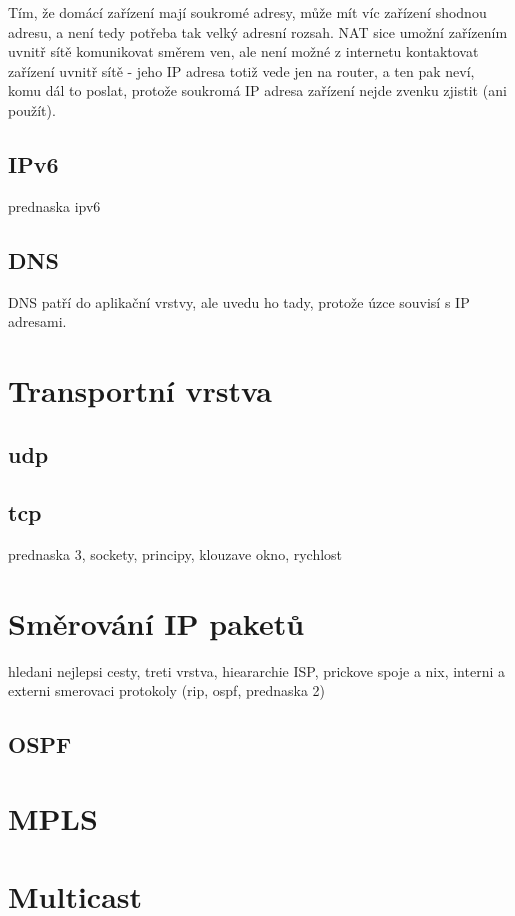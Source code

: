 Tím, že domácí zařízení mají soukromé adresy, může mít víc zařízení shodnou adresu, a není tedy potřeba tak velký adresní rozsah. NAT sice umožní zařízením uvnitř sítě komunikovat směrem ven, ale není možné z internetu kontaktovat zařízení uvnitř sítě - jeho IP adresa totiž vede jen na router, a ten pak neví, komu dál to poslat, protože soukromá IP adresa zařízení nejde zvenku zjistit (ani použít).



\subsection{IPv6}
prednaska ipv6

\subsection{DNS}

DNS patří do aplikační vrstvy, ale uvedu ho tady, protože úzce souvisí s IP adresami.

\section{Transportní vrstva}

\subsection{udp}

\subsection{tcp}
prednaska 3, sockety, principy, klouzave okno, rychlost




\section{Směrování IP paketů}
hledani nejlepsi cesty, treti vrstva, hieararchie ISP, prickove spoje a nix, interni a externi smerovaci protokoly (rip, ospf, prednaska 2)
\subsection{OSPF}



\section{MPLS}



\section{Multicast}


















